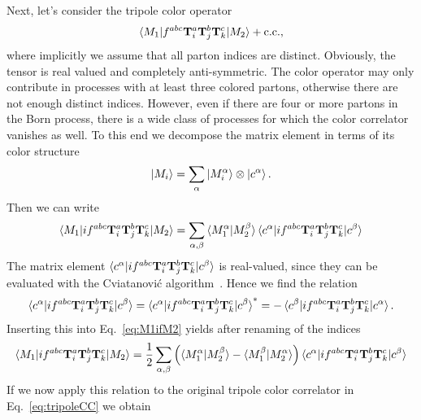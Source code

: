 \documentclass[a4paper,11pt]{article}
\begin{document}
Next, let's consider the tripole color operator
\begin{equation}
\braket{M_1| f^{abc} \mathbf{T}_i^a \mathbf{T}_j^b \mathbf{T}_k^c | M_2} + \text{c.c.},
\label{eq:tripoleCC}
\end{equation}
where implicitly we assume that all parton indices are distinct. Obviously, the tensor is real valued and completely anti-symmetric. The color operator may only contribute in processes with at least three colored partons, otherwise there are not enough distinct indices. However, even if there are four or more partons in the Born process, there is a wide class of processes for which the color correlator vanishes as well. To this end we decompose the matrix element in terms of its color structure
\begin{equation}
\ket{M_i} = \sum_\alpha \ket{M_i^\alpha} \otimes \ket{c^\alpha}.
\end{equation}
Then we can write
\begin{equation}
\begin{split}
\braket{M_1| i f^{abc} \mathbf{T}_i^a \mathbf{T}_j^b \mathbf{T}_k^c |M_2 } &= \sum_{\alpha, \beta} \braket{M_1^\alpha| M_2^\beta} \braket{c^\alpha|i f^{abc} \mathbf{T}_i^a \mathbf{T}_j^b \mathbf{T}_k^c|c^\beta}\\
\label{eq:M1ifM2}
\end{split}
\end{equation}
The matrix element $\braket{c^\alpha |i f^{abc} \mathbf{T}_i^a \mathbf{T}_j^b \mathbf{T}_k^c |c^\beta}$ is real-valued, since they can be evaluated with the Cviatanovi\'{c} algorithm~\cite{Cvitanovic:1976am}. Hence we find the relation
\begin{equation}
\braket{c^\alpha |i f^{abc} \mathbf{T}_i^a \mathbf{T}_j^b \mathbf{T}_k^c |c^\beta} = \braket{c^\alpha |i f^{abc} \mathbf{T}_i^a \mathbf{T}_j^b \mathbf{T}_k^c |c^\beta}^* = -\braket{c^\beta |i f^{abc} \mathbf{T}_i^a \mathbf{T}_j^b \mathbf{T}_k^c |c^\alpha}.
\end{equation}
Inserting this into Eq.~\eqref{eq:M1ifM2} yields after renaming of the indices
\begin{equation}
\braket{M_1| i f^{abc} \mathbf{T}_i^a \mathbf{T}_j^b \mathbf{T}_k^c |M_2 } = \frac{1}{2} \sum_{\alpha, \beta} \left(\braket{M_1^\alpha| M_2^\beta} - \braket{M_1^\beta|M_2^\alpha} \right) \braket{c^\alpha| i f^{abc} \mathbf{T}_i^a \mathbf{T}_j^b \mathbf{T}_k^c| c^\beta}
\end{equation}
If we now apply this relation to the original tripole color correlator in Eq.~\eqref{eq:tripoleCC} we obtain
\end{document}
